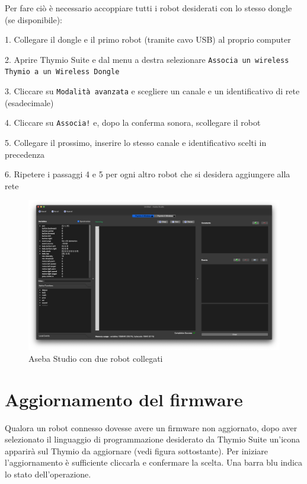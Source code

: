 \documentclass[12pt]{article}
\begin{document}
	Per fare ciò è necessario accoppiare tutti i robot desiderati con lo stesso dongle (se disponibile):
	
	1. Collegare il dongle e il primo robot (tramite cavo USB) al proprio computer
	
	2. Aprire Thymio Suite e dal menu a destra selezionare \texttt{Associa un wireless Thymio a un Wireless Dongle}
	
	3. Cliccare su \texttt{Modalità avanzata} e scegliere un canale e un identificativo di rete (esadecimale)
	
	4. Cliccare su \texttt{Associa!} e, dopo la conferma sonora, scollegare il robot
	
	5. Collegare il prossimo, inserire lo stesso canale e identificativo scelti in precedenza
	
	6. Ripetere i passaggi 4 e 5 per ogni altro robot che si desidera aggiungere alla rete
	
	
	\begin{figure}[H]
		\includegraphics[width=\textwidth]{img/multiRobot.png}
		\caption{Aseba Studio con due robot collegati}
		\label{multiRobot}
	\end{figure}
	
	\newpage
	
		
\section{Aggiornamento del firmware}
	
	Qualora un robot connesso dovesse avere un firmware non aggiornato, dopo aver selezionato il linguaggio di programmazione desiderato da Thymio Suite un'icona apparirà sul Thymio da aggiornare (vedi figura sottostante). Per iniziare l'aggiornamento è sufficiente cliccarla e confermare la scelta. Una barra blu indica lo stato dell'operazione.
	
\end{document}
